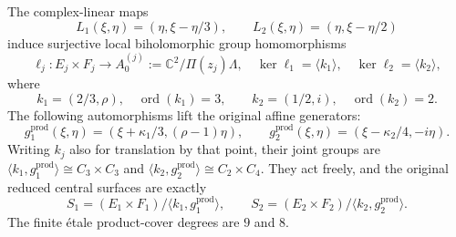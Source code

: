 \begin{theorem}
\label{wb:ffcert:thm:product-covers}
The complex-linear maps
\[
 L_1(\xi,\eta)=(\eta,\xi-\eta/3),\qquad
 L_2(\xi,\eta)=(\eta,\xi-\eta/2)
 \tag{FF12}\label{wb:ffcert:eq:addition-maps}
\]
induce surjective local biholomorphic group homomorphisms
\[
 \ell_j:E_j\times F_j\longrightarrow
 A_0^{(j)}:=\mathbb C^2/\Pi(z_j)\Lambda,
 \quad \ker\ell_1=\langle k_1\rangle,
 \quad \ker\ell_2=\langle k_2\rangle,
 \tag{FF13}\label{wb:ffcert:eq:torus-covers}
\]
where
\[
 k_1=(2/3,\rho),\quad \operatorname{ord}(k_1)=3,
 \qquad k_2=(1/2,i),\quad \operatorname{ord}(k_2)=2.
 \tag{FF14}\label{wb:ffcert:eq:kernel-points}
\]
The following automorphisms lift the original affine generators:
\[
 g^{\mathrm{prod}}_1(\xi,\eta)
   =(\xi+\kappa_1/3,(\rho-1)\eta),\qquad
 g^{\mathrm{prod}}_2(\xi,\eta)
   =(\xi-\kappa_2/4,-i\eta).
 \tag{FF15}\label{wb:ffcert:eq:product-generators}
\]
Writing $k_j$ also for translation by that point, their joint groups
are $\langle k_1,g^{\mathrm{prod}}_1\rangle\cong C_3\times C_3$
and $\langle k_2,g^{\mathrm{prod}}_2\rangle\cong C_2\times C_4$.
They act freely, and the original reduced central surfaces are exactly
\[
 S_1=(E_1\times F_1)/\langle k_1,g^{\mathrm{prod}}_1\rangle,
 \qquad
 S_2=(E_2\times F_2)/\langle k_2,g^{\mathrm{prod}}_2\rangle.
 \tag{FF16}\label{wb:ffcert:eq:surface-product-covers}
\]
The finite \'etale product-cover degrees are $9$ and $8$.
\end{theorem}

